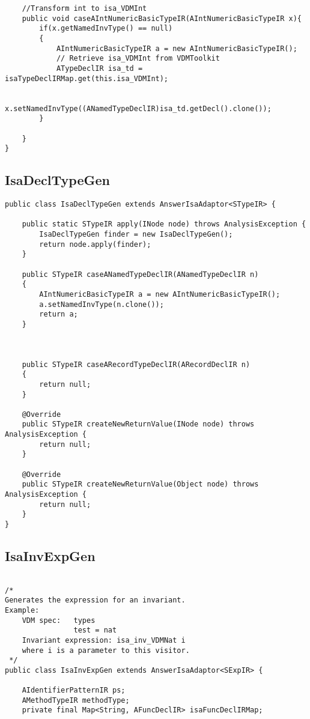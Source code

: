 \begin{appendices}
\begin{lstlisting}
    //Transform int to isa_VDMInt
    public void caseAIntNumericBasicTypeIR(AIntNumericBasicTypeIR x){
        if(x.getNamedInvType() == null)
        {
            AIntNumericBasicTypeIR a = new AIntNumericBasicTypeIR();
            // Retrieve isa_VDMInt from VDMToolkit
            ATypeDeclIR isa_td = isaTypeDeclIRMap.get(this.isa_VDMInt);

            x.setNamedInvType((ANamedTypeDeclIR)isa_td.getDecl().clone());
        }

    }
}
\end{lstlisting}
\subsection{IsaDeclTypeGen} \label{IsaDeclTypeGenbefore}
\begin{lstlisting}
public class IsaDeclTypeGen extends AnswerIsaAdaptor<STypeIR> {

    public static STypeIR apply(INode node) throws AnalysisException {
        IsaDeclTypeGen finder = new IsaDeclTypeGen();
        return node.apply(finder);
    }

    public STypeIR caseANamedTypeDeclIR(ANamedTypeDeclIR n)
    {
        AIntNumericBasicTypeIR a = new AIntNumericBasicTypeIR();
        a.setNamedInvType(n.clone());
        return a;
    }



    public STypeIR caseARecordTypeDeclIR(ARecordDeclIR n)
    {
        return null;
    }

    @Override
    public STypeIR createNewReturnValue(INode node) throws AnalysisException {
        return null;
    }

    @Override
    public STypeIR createNewReturnValue(Object node) throws AnalysisException {
        return null;
    }
}

\end{lstlisting}
\subsection{IsaInvExpGen} \label{IsaInvExpGenbefore}
\begin{lstlisting}

/*
Generates the expression for an invariant.
Example:
    VDM spec:   types
                test = nat
    Invariant expression: isa_inv_VDMNat i
    where i is a parameter to this visitor.
 */
public class IsaInvExpGen extends AnswerIsaAdaptor<SExpIR> {

    AIdentifierPatternIR ps;
    AMethodTypeIR methodType;
    private final Map<String, AFuncDeclIR> isaFuncDeclIRMap;


\end{lstlisting}
\end{appendices}
